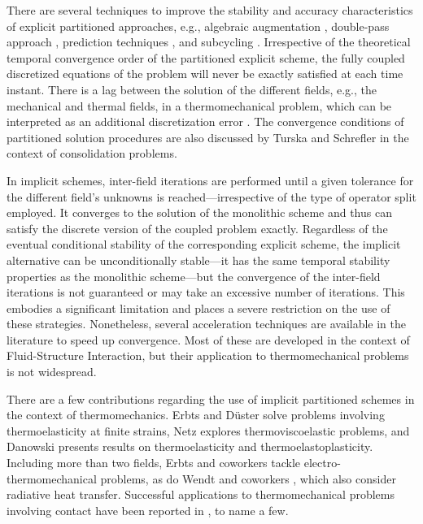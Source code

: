 There are several techniques to improve the stability and accuracy characteristics of explicit partitioned approaches, e.g., algebraic augmentation \citep{park_stabilization_1977, park_stabilization_1983}, double-pass approach \citep{armero_new_1992, piperno_explicitimplicit_1997, farhat_provably_2006, farhat_robust_2010}, prediction techniques \citep{piperno_explicitimplicit_1997, piperno_partitioned_2001, michler_efficient_2005, farhat_provably_2006}, and subcycling \citep{piperno_partitioned_1995, farhat_high_1997, piperno_explicitimplicit_1997}.
Irrespective of the theoretical temporal convergence order of the partitioned explicit scheme, the fully coupled discretized equations of the problem will never be exactly satisfied at each time instant.
There is a lag between the solution of the different fields, e.g., the mechanical and thermal fields, in a thermomechanical problem, which can be interpreted as an additional discretization error \citep{michler_efficient_2005}.
The convergence conditions of partitioned solution procedures are also discussed by Turska and Schrefler \citep{turskaConvergenceConditionsPartitioned1993a} in the context of consolidation problems.

In implicit schemes, inter-field iterations are performed until a given tolerance for the different field's unknowns is reached---irrespective of the type of operator split employed.
It converges to the solution of the monolithic scheme and thus can satisfy the discrete version of the coupled problem exactly.
Regardless of the eventual conditional stability of the corresponding explicit scheme, the implicit alternative can be unconditionally stable---it has the same temporal stability properties as the monolithic scheme---but the convergence of the inter-field iterations is not guaranteed or may take an excessive number of iterations.
This embodies a significant limitation and places a severe restriction on the use of these strategies.
Nonetheless, several acceleration techniques are available in the literature to speed up convergence.
Most of these are developed in the context of Fluid-Structure Interaction, but their application to thermomechanical problems is not widespread.

There are a few contributions regarding the use of implicit partitioned schemes in the context of thermomechanics.
Erbts and Düster \citep{erbts_accelerated_2012} solve problems involving thermoelasticity at finite strains, Netz \citep{netz_high-order_2013} explores thermoviscoelastic problems, and Da\-now\-ski \citep{danowski_computational_2014} presents results on thermoelasticity and thermoelastoplasticity.
Including more than two fields, Erbts and coworkers \citep{erbts_partitioned_2015} tackle electro-thermomechanical problems, as do Wendt and coworkers \citep{wendt_partitioned_2015}, which also consider radiative heat transfer.
Successful applications to thermomechanical problems involving contact have been reported in \citet{johansson_thermoelastic_1993,rieger2004AdaptiveMethodsThermomechanical,temizer2011ThermomechanicalContactHomogenization,kruger2020PorousductileFractureThermoelastoplastic}, to name a few.

